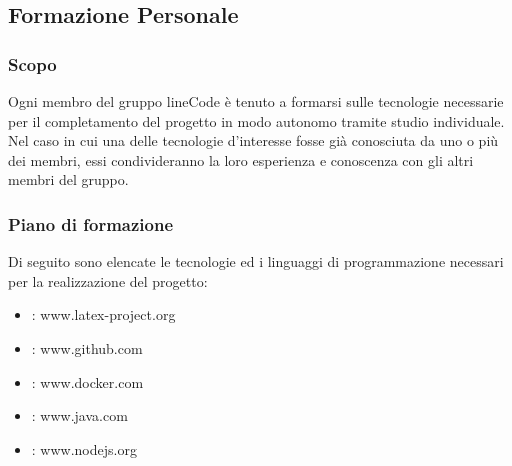 \textsl{}
\subsection{Formazione Personale}

	\subsubsection{Scopo}
	Ogni membro del gruppo lineCode è tenuto a formarsi sulle tecnologie necessarie per il completamento del progetto in modo autonomo tramite studio individuale. Nel caso in cui una delle tecnologie d'interesse fosse già conosciuta da uno o più dei membri, essi condivideranno la loro esperienza e conoscenza con gli altri membri del gruppo.

	\subsubsection{Piano di formazione}
	Di seguito sono elencate le tecnologie ed i linguaggi di programmazione necessari per la realizzazione del progetto:
	\begin{itemize}
		\item \glock{\LaTeX} : www.latex-project.org
		\item {} : www.github.com
		\item {} : www.docker.com
		\item {} : www.java.com
		\item {} : www.nodejs.org
	\end{itemize}

